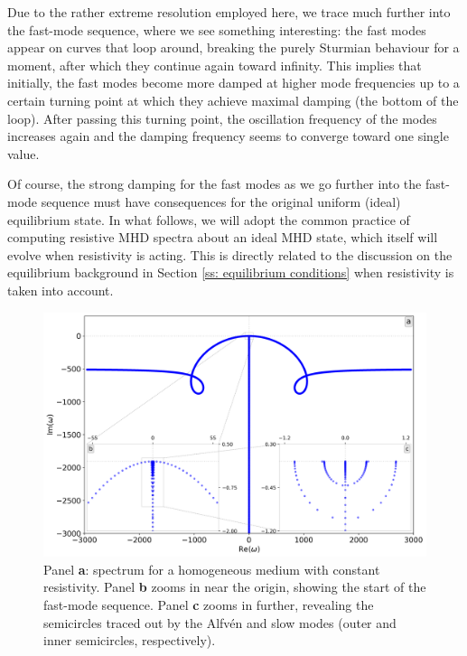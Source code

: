 Due to the rather extreme resolution employed here, we trace much further into the fast-mode sequence, where we see something interesting: the fast modes appear on curves that loop around, breaking the purely Sturmian behaviour for a moment, after which they continue again toward infinity. This implies that initially, the fast modes become more damped at higher mode frequencies up to a certain turning point at which they achieve maximal damping (the bottom of the loop). After passing this turning point, the oscillation frequency of the modes increases again and the damping frequency seems to converge toward one single value.

Of course, the strong damping for the fast modes as we go further into the fast-mode sequence must have consequences for the original uniform (ideal) equilibrium state. In what follows, we will adopt the common practice of computing resistive MHD spectra about an ideal MHD state, which itself will evolve when resistivity is acting. This is directly related to the discussion on the equilibrium background in Section \ref{ss: equilibrium conditions} when resistivity is taken into account.

\begin{figure}[t]
  \centering
  \includegraphics[width=\textwidth]{resistive_homo.png}
  \caption{
    Panel \textbf{a}: spectrum for a homogeneous medium with constant resistivity. Panel \textbf{b} zooms in near the origin, showing the start of the fast-mode sequence. Panel \textbf{c} zooms in further, revealing the semicircles traced out by the Alfv\'en and slow modes (outer and inner semicircles, respectively).
  }
  \label{fig: resistive_homo}
\end{figure}


